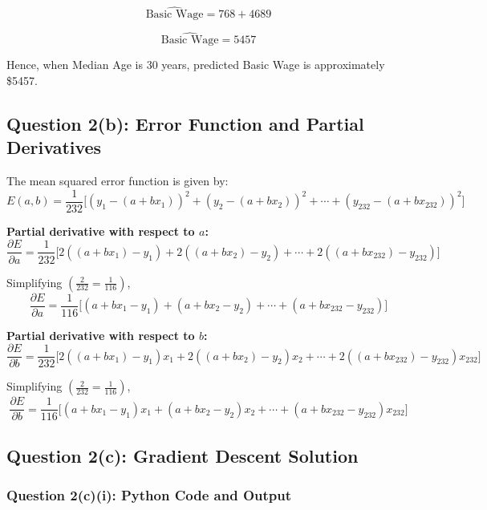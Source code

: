 \documentclass[12pt,a4paper,oneside]{report}
\begin{document}
\[
\widehat{\text{Basic Wage}} = 768 + 4689
\]

\[
\widehat{\text{Basic Wage}} = 5457
\]

Hence, when Median Age is 30 years, predicted Basic Wage is approximately \$5457.
\subsection{Question 2(b): Error Function and Partial Derivatives}

The mean squared error function is given by:
\[
E(a,b)
= \frac{1}{232}
\Big[
(y_1 - (a + b x_1))^2
+ (y_2 - (a + b x_2))^2
+ \cdots
+ (y_{232} - (a + b x_{232}))^2
\Big]
\]

\textbf{Partial derivative with respect to $a$:}
\[
\frac{\partial E}{\partial a}
= \frac{1}{232}
\Big[
2((a + b x_1) - y_1)
+ 2((a + b x_2) - y_2)
+ \cdots
+ 2((a + b x_{232}) - y_{232})
\Big]
\]

Simplifying $\left( \frac{2}{232} = \frac{1}{116} \right)$,
\[
\frac{\partial E}{\partial a}
= \frac{1}{116}
\Big[
(a + b x_1 - y_1)
+ (a + b x_2 - y_2)
+ \cdots
+ (a + b x_{232} - y_{232})
\Big]
\]

\textbf{Partial derivative with respect to $b$:}
\[
\frac{\partial E}{\partial b}
= \frac{1}{232}
\Big[
2((a + b x_1) - y_1)x_1
+ 2((a + b x_2) - y_2)x_2
+ \cdots
+ 2((a + b x_{232}) - y_{232})x_{232}
\Big]
\]

Simplifying $\left( \frac{2}{232} = \frac{1}{116} \right)$,
\[
\frac{\partial E}{\partial b}
= \frac{1}{116}
\Big[
(a + b x_1 - y_1)x_1
+ (a + b x_2 - y_2)x_2
+ \cdots
+ (a + b x_{232} - y_{232})x_{232}
\Big]
\]

\subsection{Question 2(c): Gradient Descent Solution}

\subsubsection{Question 2(c)(i): Python Code and Output}
\end{document}
